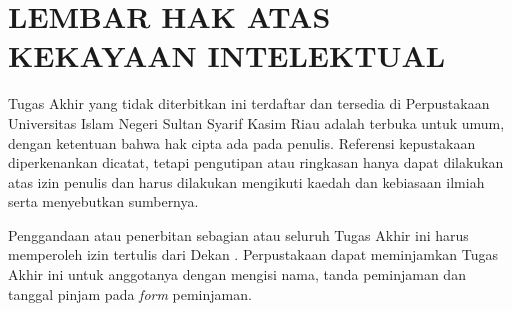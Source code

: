 %
%
%
%


\chapter*{LEMBAR HAK ATAS KEKAYAAN INTELEKTUAL}

Tugas Akhir yang tidak diterbitkan ini terdaftar dan tersedia di Perpustakaan Universitas Islam Negeri Sultan Syarif Kasim Riau adalah terbuka untuk umum, dengan ketentuan bahwa hak cipta ada pada penulis. Referensi kepustakaan diperkenankan dicatat, tetapi pengutipan atau ringkasan hanya dapat dilakukan atas izin penulis dan harus dilakukan mengikuti kaedah dan kebiasaan ilmiah serta menyebutkan sumbernya.

Penggandaan atau penerbitan sebagian atau seluruh Tugas Akhir ini harus memperoleh izin tertulis dari Dekan \@fakultas \@universitas. Perpustakaan dapat meminjamkan Tugas Akhir ini untuk anggotanya dengan mengisi nama, tanda peminjaman dan tanggal pinjam pada \emph{form} peminjaman.